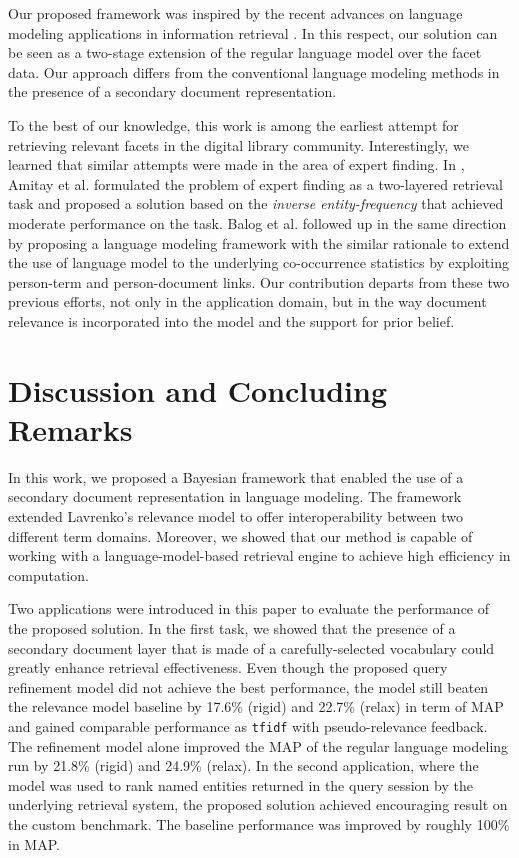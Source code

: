 Our proposed framework was inspired by the recent advances on language modeling
applications in information retrieval
\cite{lavrenko2001relevance,zhai2001language,zaragorza2003bayesian}.  In this
respect, our solution can be seen as a two-stage extension of the regular
language model over the facet data.  Our approach differs from the conventional
language modeling methods in the presence of a secondary document
representation.  

To the best of our knowledge, this work is among the earliest attempt for
retrieving relevant facets in the digital library community.  Interestingly, we
learned that similar attempts were made in the area of expert finding.  In
\cite{amitay2008finding}, Amitay et al. formulated the problem of expert
finding as a two-layered retrieval task and proposed a solution based on the
\emph{inverse entity-frequency} that achieved moderate performance on the task.
Balog et al. \cite{balog2009language} followed up in the same direction by
proposing a language modeling framework with the similar rationale to extend
the use of language model to the underlying co-occurrence statistics by
exploiting person-term and person-document links.  Our contribution departs
from these two previous efforts, not only in the application domain, but in the
way document relevance is incorporated into the model and the support for prior
belief.  
 
\section{Discussion and Concluding Remarks}\label{s:concluding-remarks}

In this work, we proposed a Bayesian framework that enabled the use of a
secondary document representation in language modeling.  The framework extended
Lavrenko's relevance model to offer interoperability between two different
term domains.  Moreover, we showed that our method is capable of working with a
language-model-based retrieval engine to achieve high efficiency in
computation.  

Two applications were introduced in this paper to evaluate the performance of
the proposed solution.  In the first task, we showed that the presence of a
secondary document layer that is made of a carefully-selected vocabulary could
greatly enhance retrieval effectiveness.  Even though the proposed query
refinement model did not achieve the best performance, the model still beaten
the relevance model baseline by 17.6\% (rigid) and 22.7\% (relax) in term of
MAP and gained comparable performance as {\tt tfidf} with pseudo-relevance
feedback.  The refinement model alone improved the MAP of the regular language
modeling run by 21.8\% (rigid) and 24.9\% (relax).  In the second application,
where the model was used to rank named entities returned in the query session
by the underlying retrieval system, the proposed solution achieved encouraging
result on the custom benchmark.  The baseline performance was improved by
roughly 100\% in MAP.  

